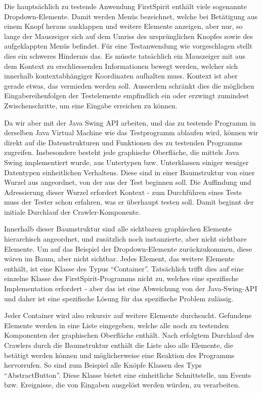 Die hauptsächlich zu testende Anwendung FirstSpirit enthält viele sogenannte Dropdown-Elemente.
Damit werden Menüs bezeichnet, welche bei Betätigung aus einem Knopf heraus ausklappen und
weitere Elemente anzeigen, aber nur, so lange der Mauszeiger sich auf dem Umriss des
ursprünglichen Knopfes sowie des aufgeklappten Menüs befindet. Für eine Testanwendung
wie vorgeschlagen stellt dies ein schweres Hindernis das. Es müsste tatsächlich ein
Mauszeiger mit aus dem Kontext zu erschliessenden Informationen bewegt werden,
welcher sich innerhalb kontextabhängiger Koordinaten aufhalten muss. Kontext ist
aber gerade etwas, das vermieden werden soll. Ausserdem schränkt dies die möglichen
Eingabereihenfolgen der Testelemente empfindlich ein oder erzwingt zumindest
Zwischenschritte, um eine Eingabe erreichen zu können.

Da wir aber mit der Java Swing API arbeiten, und das zu testende Programm
in derselben Java Virtual Machine \cite{website:javaspecs} wie das Testprogramm 
ablaufen wird, können wir direkt auf die Datenstrukturen und Funktionen
des zu testenden Programms zugreifen. Insbesondere besteht jede graphische
Oberfläche, die mittels Java Swing implementiert wurde, aus Untertypen
bzw. Unterklassen einiger weniger Datentypen einheitlichen Verhaltens.
Diese sind in einer Baumstruktur von einer Wurzel aus angeordnet, von
der aus der Test beginnen soll. Die Auffindung und Adressierung dieser
Wurzel erfordert Kontext - zum Durchführen eines Tests muss der Tester schon
erfahren, was er überhaupt testen soll. Damit beginnt der initiale
Durchlauf der Crawler-Komponente.

Innerhalb dieser Baumstruktur sind alle sichtbaren graphischen Elemente
hierarchisch angeordnet, und zusätzlich noch instanzierte, aber nicht sichtbare
Elemente. Um auf das Beispiel der Dropdown-Elemente zurückzukommen, diese
wären im Baum, aber nicht sichtbar. Jedes Element, das weitere Elemente enthält,
ist eine Klasse des Typus ``Container''. Tatsächlich trifft dies auf eine
einzelne Klasse des FirstSpirit-Programms nicht zu, welches eine spezifische
Implementation erfordert - aber das ist eine Abweichung von der Java-Swing-API
und daher ist eine spezifische Lösung für das spezifische Problem zulässig.

Jeder Container wird also rekursiv auf weitere Elemente durchsucht.
Gefundene Elemente werden in eine Liste eingegeben, welche alle noch zu
testenden Komponenten der graphischen Oberfläche enthält. Nach erfolgtem
Durchlauf des Crawlers durch die Baumstruktur enthält die Liste also
alle Elemente, die betätigt werden können und möglicherweise eine Reaktion
des Programms hervorrufen. So sind zum Beispiel alle Knöpfe Klassen des
Typs ``AbstractButton''. Diese Klasse bietet eine einheitliche Schnittstelle,
um Events bzw. Ereignisse, die von Eingaben ausgelöst werden würden,
zu verarbeiten. 

